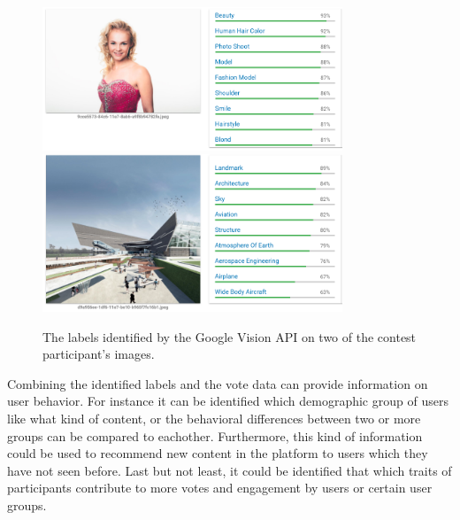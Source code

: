     \begin{figure}[h] 
		\begin{center}
            \includegraphics[width=0.8\textwidth]{images/google_vision_labels.png}
            \includegraphics[width=0.8\textwidth]{images/google_vision_labels2.png}
			\caption{The labels identified by the Google Vision API on two of the contest participant's images.}
			\label{google_vision_labels}
		\end{center}
    \end{figure}

    Combining the identified labels and the vote data can provide information on user behavior. For instance it can be identified which demographic group of users like what kind of content, or the behavioral differences between two or more groups can be compared to eachother. Furthermore, this kind of information could be used to recommend new content in the platform to users which they have not seen before. Last but not least, it could be identified that which traits of participants contribute to more votes and engagement by users or certain user groups.  
    
